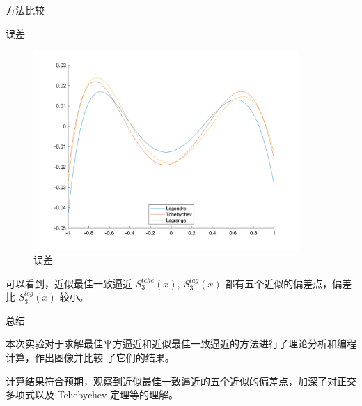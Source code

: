 \documentclass[a4paper]{article}
\begin{document}
\begin{multicols}{2}
\begin{section}{方法比较}
\begin{subsection}{误差}
		\begin{figure}[ht] %
			\centering %
			\includegraphics[width = 0.9\textwidth]{img/error.png} 
			\caption{误差}
			\label{error} 
		\end{figure}
		
		可以看到，近似最佳一致逼近 $S_3^{tche}(x),\ S_3^{lag}(x)$ 都有五个近似的偏差点，偏差比 $S_3^{leg}(x)$ 较小。
		
	\end{subsection}

	
\end{section}
	
\begin{section}{总结}
	
	本次实验对于求解最佳平方逼近和近似最佳一致逼近的方法进行了理论分析和编程计算，作出图像并比较 了它们的结果。
	
	计算结果符合预期，观察到近似最佳一致逼近的五个近似的偏差点，加深了对正交多项式以及 Tchebychev 定理等的理解。
	
\end{section}

\end{multicols}

%
%

\end{document}
